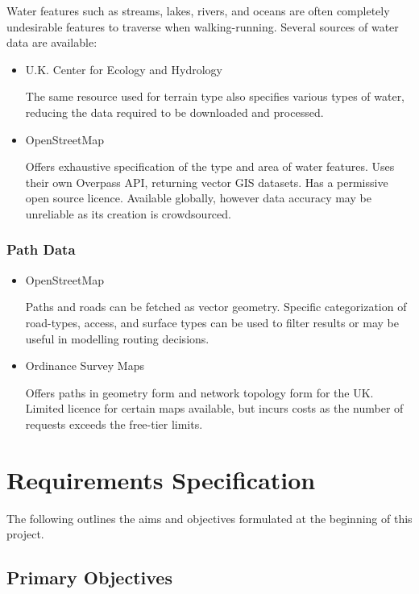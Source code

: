 \documentclass[12pt]{article}
\begin{document}
Water features such as streams, lakes, rivers, and oceans are often completely undesirable features to traverse when walking-running. Several sources of water data are available:

\begin{itemize}
  \item U.K. Center for Ecology and Hydrology

        The same resource used for terrain type also specifies various types of water, reducing the data required to be downloaded and processed.

  \item OpenStreetMap \autocite{wiki:osm}

        Offers exhaustive specification of the type and area of water features. Uses their own Overpass API, returning vector GIS datasets. Has a permissive open source licence. Available globally, however data accuracy may be unreliable as its creation is crowdsourced.

\end{itemize}

\subsubsection{Path Data}

\begin{itemize}
  \item OpenStreetMap \autocite{wiki:osm}

        Paths and roads can be fetched as vector geometry. Specific categorization of road-types, access, and surface types can be used to filter results or may be useful in modelling routing decisions.

  \item Ordinance Survey Maps

        Offers paths in geometry form and network topology form for the UK. Limited licence for certain maps available, but incurs costs as the number of requests exceeds the free-tier limits.

\end{itemize}

\section{Requirements Specification}

The following outlines the aims and objectives formulated at the beginning of this project.

\subsection{Primary Objectives}
\end{document}
